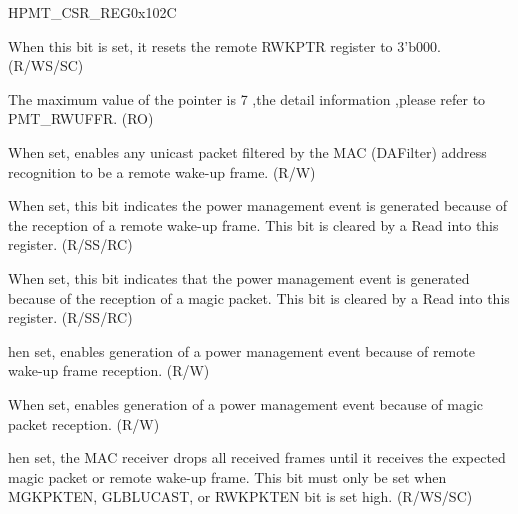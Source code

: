 \begin{register}{H}{PMT\_CSR\_REG}{0x102C}\label{regdesc:PMT_CSRREG}
%
%
%
%
%
%
%
%
%
%
%
%
\regnewline%
\begin{regdesc}\begin{reglist}
\item [RWKFILTRST] When this bit is set, it resets the remote RWKPTR register to 3’b000. (R/WS/SC)
\item [RWKPTR] The maximum value of the pointer is 7 ,the detail information ,please refer to PMT\_RWUFFR. (RO)
\item [GLBLUCAST] When set, enables any unicast packet filtered by the MAC (DAFilter) address recognition to be a remote wake-up frame. (R/W)
\item [RWKPRCVD] When set, this bit indicates the power management event is generated because of the reception of a remote wake-up frame. This bit is cleared by a Read into this register. (R/SS/RC)
\item [MGKPRCVD] When set, this bit indicates that the power management event is generated because of the reception of a magic packet. This bit is cleared by a Read into this register. (R/SS/RC)
\item [RWKPKTEN] hen set, enables generation of a power management event because of remote wake-up frame reception. (R/W)
\item [MGKPKTEN] When set, enables generation of a power management event because of magic packet reception. (R/W)
\item [PWRDWN] hen set, the MAC receiver drops all received frames until it receives the expected magic packet or remote wake-up frame. This bit must only be set when MGKPKTEN, GLBLUCAST, or RWKPKTEN bit is set high. (R/WS/SC)
\end{reglist}\end{regdesc}
\end{register}


